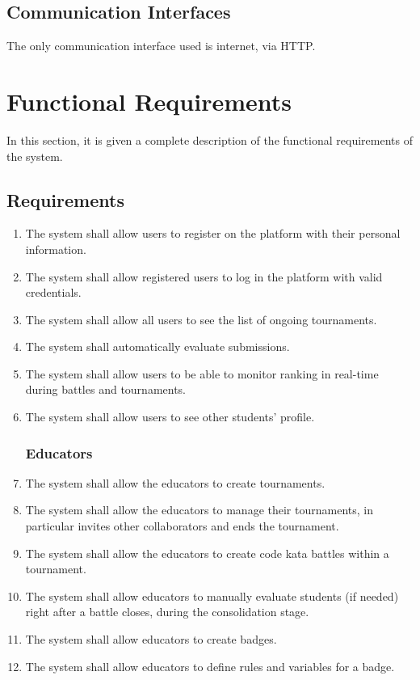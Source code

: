 \subsection{Communication Interfaces}
The only communication interface used is internet, via HTTP.
\clearpage

\section{Functional Requirements}
In this section, it is given a complete description of the functional requirements of the system.

    \subsection{Requirements}
        \begin{enumerate}[label=\textbf{R.\arabic*}]
            \subsubsection*{Users}
            \item {} {The system shall allow users to register on the platform with their personal information.}
            \item {} {The system shall allow registered users to log in the platform with valid credentials.}
            \item {} {The system shall allow all users to see the list of ongoing tournaments.}
            \item {} {The system shall automatically evaluate submissions.}
            \item {} {The system shall allow users to be able to monitor ranking in real-time during battles and tournaments.}
            \item {} {The system shall allow users to see other students' profile.}
            
            \subsubsection*{Educators}
            \item {} {The system shall allow the educators to create tournaments.}
            \item {} {The system shall allow the educators to manage their tournaments, in particular invites other collaborators and ends the tournament.}
            \item {} {The system shall allow the educators to create code kata battles within a tournament.}
             \item {} {The system shall allow educators to manually evaluate students (if needed) right after a battle closes, during the consolidation stage.}
            \item {} {The system shall allow educators to create badges.}
            \item {} {The system shall allow educators to define rules and variables for a badge.}


\end{enumerate}
